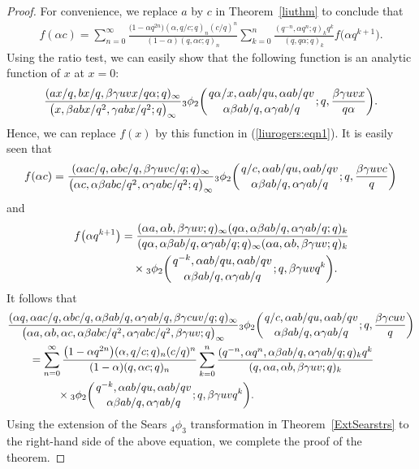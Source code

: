 \documentclass[pdftex]{sigma}
\numberwithin{equation}{section}
\begin{document}
\begin{proof}
	For convenience, we replace $a$ by $c$ in Theorem~\ref{liuthm} to conclude that
	\begin{align}\label{liurogers:eqn1}
	f(\alpha c)
	=\sum_{n=0}^\infty \frac{\bigl(1-\alpha q^{2n}\bigr)(\alpha, q/c; q)_n (c/q)^n}
	{(1-\alpha)(q, \alpha c; q)_n} \sum_{k=0}^n \frac{(q^{-n}, \alpha q^n; q)_k q^k}
	{(q, q\alpha; q)_k} f\bigl(\alpha q^{k+1}\bigr).
\end{align}
Using the ratio test, we can easily show that the following function is an analytic function of
$x$ at $x=0$:
\begin{align*}
\frac{(ax/q, bx/q, \beta \gamma uvx/q\alpha; q)_\infty}
{\bigl(x, \beta abx/q^2, \gamma abx/q^2; q\bigr)_\infty}
{_3\phi_2}\biggl({{q\alpha/x, \alpha ab/qu, \alpha ab/qv}\atop{\alpha \beta ab/q, \alpha \gamma ab/q}}; q, \frac{\beta \gamma uvx}{q\alpha}\biggr).
\end{align*}
Hence, we can replace $f(x)$ by this function in (\ref{liurogers:eqn1}). It is easily seen that
\begin{align*}
f(\alpha c) = \frac{(\alpha ac/q, \alpha bc/q, \beta \gamma uvc/q; q)_\infty}
{\bigl(\alpha c, \alpha \beta abc/q^2, \alpha \gamma abc/q^2; q\bigr)_\infty} {_3\phi_2}\biggl({{q/c, \alpha ab/qu, \alpha ab/qv}\atop{\alpha \beta ab/q, \alpha \gamma ab/q}}; q, \frac{\beta \gamma uvc}{q}\biggr)
\end{align*}
and
\begin{align*}
f\bigl(\alpha q^{k+1}\bigr)&=\frac{(\alpha a, \alpha b, \beta \gamma uv; q)_\infty (q\alpha, \alpha \beta ab/q, \alpha \gamma ab/q; q)_k}
{(q\alpha, \alpha \beta ab/q, \alpha \gamma ab/q; q)_\infty (\alpha a, \alpha b, \beta \gamma uv; q)_k}\\
&\quad \times {_3\phi_2} \biggl({{q^{-k}, \alpha ab/qu, \alpha ab/qv}
\atop{\alpha \beta ab/q, \alpha \gamma ab/q }}; q, \beta \gamma uv q^k \biggr).
\end{align*}
It follows that
\begin{align*}
& \frac{(\alpha {q}, \alpha ac/q, \alpha bc/q, \alpha \beta ab/q, \alpha \gamma ab/q, \beta \gamma cuv/q; q )_\infty}{\bigl(\alpha a, \alpha b, \alpha c, \alpha \beta abc/q^2, \alpha \gamma abc/q^2, \beta \gamma uv; q \bigr)_\infty}
{_3\phi_2} \biggl({{q/c, \alpha ab/qu, \alpha ab/qv}\atop{\alpha \beta ab/q, \alpha \gamma ab/q}}; q,
\frac{\beta \gamma cuv}{q} \biggr)\\
&\qquad{}=\sum_{n=0}^\infty \frac{\bigl(1-\alpha q^{2n}\bigr) (\alpha, q/c; q)_n (c/q)^n}{(1-\alpha)(q, \alpha c; q)_n}
\sum_{k=0}^{n} \frac{(q^{-n}, \alpha q^n, \alpha \beta ab/q, \alpha \gamma ab/q ; q)_k q^k}
{(q, \alpha a, \alpha b, \beta \gamma uv; q)_k}\\
&\qquad\hphantom{=\sum_{n=0}^\infty}{}
\times {_3\phi_2} \biggl({{q^{-k}, \alpha ab/qu, \alpha ab/qv}
\atop{\alpha \beta ab/q, \alpha \gamma ab/q }}; q, \beta \gamma uv q^k \biggr).
\end{align*}
Using the extension of the Sears $_4\phi_3$ transformation in Theorem~\ref{ExtSearstrs} to
the right-hand side of the above equation, we complete the proof of the theorem.
\end{proof}
\end{document}
